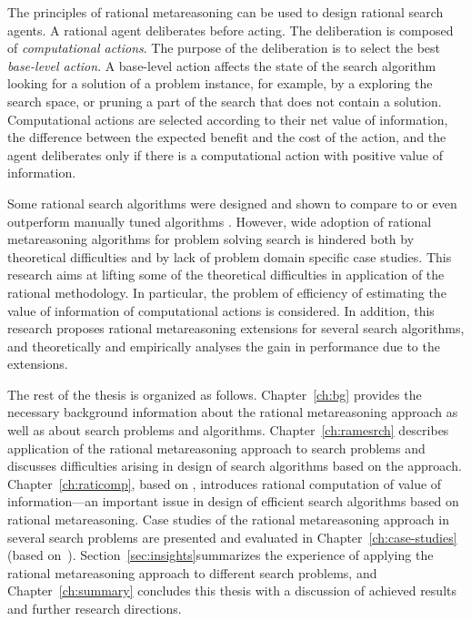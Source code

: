 The principles of rational metareasoning \cite{Russell.right} can be
used to design rational search agents. A rational agent deliberates
before acting. The deliberation is composed of {\em computational
  actions}. The purpose of the deliberation is to select the best {\em
  base-level action}. A base-level action affects the state of the
search algorithm looking for a solution of a problem instance, for
example, by a exploring the search space, or pruning a part of the
search that does not contain a solution. Computational actions are
selected according to their net value of information, the difference
between the expected benefit and the cost of the action, and the agent
deliberates only if there is a computational action with positive
value of information.

Some rational search algorithms were designed and shown to compare to
or even outperform manually tuned algorithms
\cite{Russell.right}. However, wide adoption of rational metareasoning
algorithms for problem solving search is hindered both by theoretical
difficulties and by lack of problem domain specific case studies. This
research aims at lifting some of the theoretical difficulties in
application of the rational methodology. In particular, the problem of
efficiency of estimating the value of information of computational
actions is considered. In addition, this research proposes rational
metareasoning extensions for several search algorithms, and
theoretically and empirically analyses the gain in performance due to
the extensions.

The rest of the thesis is organized as follows. Chapter~\ref{ch:bg}
provides the necessary background information about the rational
metareasoning approach as well as about search problems and
algorithms. Chapter~\ref{ch:ramesrch} describes application of the
rational metareasoning approach to search problems and discusses
difficulties arising in design of search algorithms based on the
approach. Chapter~\ref{ch:raticomp}, based
on \cite{TolpinShimony.raticomp}, introduces rational computation of
value of information---an important issue in design of efficient
search algorithms based on rational metareasoning. Case studies of the
rational metareasoning approach in several search problems are
presented and evaluated in Chapter~\ref{ch:case-studies} (based
on~\cite{TolpinShimony.csp,TolpinShimony.mcts,HayRussellTolpinShimony.selecting,TolpinEtAl.rla}).
Section~\ref{sec:insights}summarizes the experience of applying 
the rational metareasoning approach to different search problems, and
Chapter~\ref{ch:summary} concludes this thesis with a discussion of
achieved results and further research directions.
